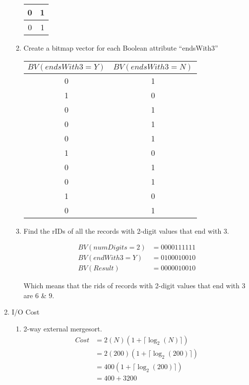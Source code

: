 \documentclass{report}
\begin{document}
\begin{enumerate}
\begin{enumerate}
\begin{center}
\begin{tabular} {|c|c|}
					0 & 1 \\ \hline
					0 & 1 \\ \hline
				\end{tabular}	
			\end{center}
			\item Create a bitmap vector for each Boolean attribute ``endsWith3'' \\
				\begin{center}
				\begin{tabular} {|c|c|}
					\hline
					$BV(endsWith3 = Y)$ & $BV(endsWith3 = N)$ \\ \hline
					0 & 1 \\ \hline
					1 & 0 \\ \hline
					0 & 1 \\ \hline
					0 & 1 \\ \hline
					0 & 1 \\ \hline
					1 & 0 \\ \hline
					0 & 1 \\ \hline
					0 & 1 \\ \hline
					1 & 0 \\ \hline
					0 & 1 \\ \hline
				\end{tabular}	
			\end{center}
			\item Find the rIDs of all the records with 2-digit values that end with 3.
			\begin{center}
				\begin{align*}
					BV(numDigits=2) &= 0000111111 \\
					BV(endWith3 =Y ) &= 0100010010 \\
					BV(Result) &= 0000010010
				\end{align*}
			\end{center}
			Which means that the rids of records with 2-digit values that end with 3 are $6$ \& $9$.
		\end{enumerate}
		\newpage
		\item I/O Cost
		\begin{enumerate}
			\item 2-way external mergesort.
			\begin{align*}
				Cost &= 2(N)(1 + \lceil\log_2(N)\rceil) \\
				&= 2(200)(1 + \lceil\log_2(200)\rceil)\\
				&= 400(1 +\lceil\log_2(200)\rceil) \\
				&= 400 + 3200 \\

\end{align*}
\end{enumerate}
\end{enumerate}
\end{document}
